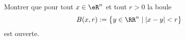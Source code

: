 
\begin{exercice}\label{exo0083}

Montrer que pour tout $x \in \eR^n$ et tout $r >0$ la boule 
\[ 
	B(x,r):=\big\{ y \in \RR^n \mid \left|x-y \right| < r \big\}
\]
est ouverte.

\end{exercice}
